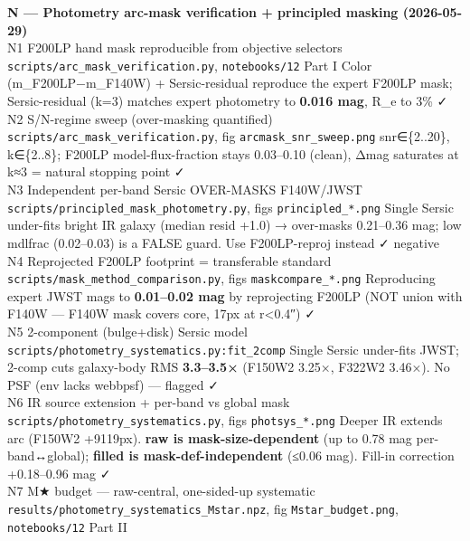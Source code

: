 \documentclass[
  10pt,
]{article}
\begin{document}
\textbf{N --- Photometry arc-mask verification + principled masking (2026-05-29)} \textbar{} \textbar{} \textbar{} \textbar{} \textbar{}\\
N1 \textbar{} F200LP hand mask reproducible from objective selectors \textbar{} \texttt{scripts/arc\_mask\_verification.py}, \texttt{notebooks/12} Part I \textbar{} Color (m\_F200LP−m\_F140W) +
Sersic-residual reproduce the expert F200LP mask; Sersic-residual (k=3) matches expert photometry to \textbf{0.016 mag}, R\_e to 3\% \textbar{} ✓ \textbar{}\\
N2 \textbar{} S/N-regime sweep (over-masking quantified) \textbar{} \texttt{scripts/arc\_mask\_verification.py}, fig \texttt{arcmask\_snr\_sweep.png} \textbar{} snr∈\{2..20\}, k∈\{2..8\}; F200LP
model-flux-fraction stays 0.03--0.10 (clean), Δmag saturates at k≈3 = natural stopping point \textbar{} ✓ \textbar{}\\
N3 \textbar{} Independent per-band Sersic OVER-MASKS F140W/JWST \textbar{} \texttt{scripts/principled\_mask\_photometry.py}, figs \texttt{principled\_*.png} \textbar{} Single Sersic under-fits bright
IR galaxy (median resid +1.0) → over-masks 0.21--0.36 mag; low mdlfrac (0.02--0.03) is a FALSE guard. Use F200LP-reproj instead \textbar{} ✓ negative \textbar{}\\
N4 \textbar{} Reprojected F200LP footprint = transferable standard \textbar{} \texttt{scripts/mask\_method\_comparison.py}, figs \texttt{maskcompare\_*.png} \textbar{} Reproducing expert JWST mags to
\textbf{0.01--0.02 mag} by reprojecting F200LP (NOT union with F140W --- F140W mask covers core, 17px at r\textless0.4″) \textbar{} ✓ \textbar{}\\
N5 \textbar{} 2-component (bulge+disk) Sersic model \textbar{} \texttt{scripts/photometry\_systematics.py:fit\_2comp} \textbar{} Single Sersic under-fits JWST; 2-comp cuts galaxy-body RMS
\textbf{3.3--3.5×} (F150W2 3.25×, F322W2 3.46×). No PSF (env lacks webbpsf) --- flagged \textbar{} ✓ \textbar{}\\
N6 \textbar{} IR source extension + per-band vs global mask \textbar{} \texttt{scripts/photometry\_systematics.py}, figs \texttt{photsys\_*.png} \textbar{} Deeper IR extends arc (F150W2 +9119px).
\textbf{raw is mask-size-dependent} (up to 0.78 mag per-band↔global); \textbf{filled is mask-def-independent} (≤0.06 mag). Fill-in correction +0.18--0.96 mag \textbar{} ✓ \textbar{}\\
N7 \textbar{} M★ budget --- raw-central, one-sided-up systematic \textbar{} \texttt{results/photometry\_systematics\_Mstar.npz}, fig \texttt{Mstar\_budget.png}, \texttt{notebooks/12} Part II
\end{document}
